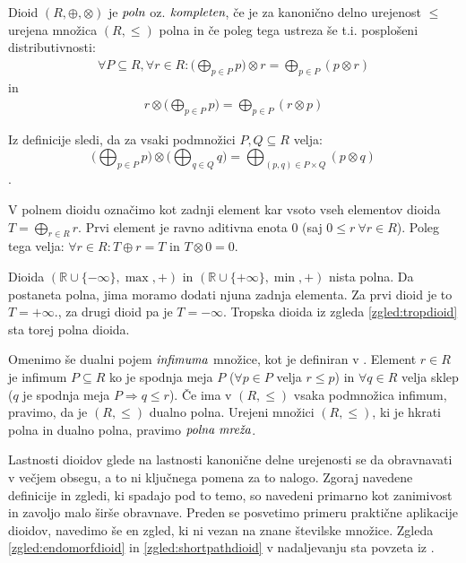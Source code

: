 \documentclass[mat1]{fmfdelo}
\newcommand{\R}{\mathbb{R}}
\newcommand{\pojem}[1]{\ensuremath{\emph{#1}}}
\begin{document}
\begin{definicija}
	Dioid $(R, \oplus,\otimes)$ je \pojem{poln} oz. \pojem{kompleten}, če je za kanonično delno urejenost $\leq$ urejena množica $(R, \leq)$ polna in če poleg tega ustreza še t.i. posplošeni distributivnosti: \begin{align*}
		\forall P \subseteq R, \forall r \in R: \big(\bigoplus_{p\in P}p\big) \otimes r = \bigoplus_{p\in P} \left(p \otimes r\right)
	\end{align*}
in
\begin{align*}
	r \otimes \big( \bigoplus_{p\in P} p \big) = \bigoplus_{p \in P} \left( r \otimes p \right)
\end{align*}
\end{definicija}

Iz definicije sledi, da za vsaki podmnožici $P, Q \subseteq R$ velja: $$\big( \bigoplus_{p\in P} p \big) \otimes \big( \bigoplus_{q\in Q} q \big) = \bigoplus_{(p, q) \in P\times Q} (p \otimes q)$$.

V polnem dioidu označimo kot zadnji element kar vsoto vseh elementov dioida $T = \bigoplus_{r \in R} r$. Prvi element je ravno aditivna enota $0$ (saj $0\leq r~\forall r\in R$). Poleg tega velja: $\forall r\in R: T \oplus r = T$ in $T \otimes 0 = 0$.

\begin{zgled}
	Dioida $(\R\cup \{-\infty\}, \max, +)$ in $(\R\cup \{+\infty\}, \min, +)$ nista polna. Da postaneta polna, jima moramo dodati njuna zadnja elementa. Za prvi dioid je to $T = +\infty$., za drugi dioid pa je $T = -\infty$. Tropska dioida iz zgleda \ref{zgled:tropdioid} sta torej polna dioida.
\end{zgled}

\begin{opomba}
	Omenimo še dualni pojem \pojem{infimuma} množice, kot je definiran v \cite[str. 10]{bib:Gondran}.
	Element $r\in R$ je infimum $P\subseteq R$ ko je spodnja meja $P$ ($\forall p \in P$ velja $ r \leq p$) in $\forall q \in R$ velja sklep ($q$ je spodnja meja $P \Rightarrow q \leq r$). Če ima v $(R, \leq)$ vsaka podmnožica infimum, pravimo, da je $(R, \leq)$ dualno polna. Urejeni množici $(R, \leq)$, ki je hkrati polna in dualno polna, pravimo \pojem{polna mreža}.
\end{opomba}

Lastnosti dioidov glede na lastnosti kanonične delne urejenosti se da obravnavati v večjem obsegu, a to ni ključnega pomena za to nalogo. Zgoraj navedene definicije in zgledi, ki spadajo pod to temo, so navedeni primarno kot zanimivost in zavoljo malo širše obravnave. Preden se posvetimo primeru praktične aplikacije dioidov, navedimo še en zgled, ki ni vezan na znane številske množice. Zgleda \ref{zgled:endomorfdioid} in \ref{zgled:shortpathdioid} v nadaljevanju sta povzeta iz \cite[poglavje 6.\,2.\,]{bib:Gondran}.
\end{document}
